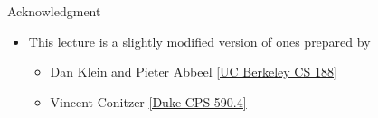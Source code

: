 \documentclass[11pt,aspectratio=169,handout]{beamer}
\begin{document}
  
  \begin{frame}{Acknowledgment}
   \begin{itemize}
   \setlength{\itemsep}{1em}
    \item This lecture is a slightly modified version of ones prepared by
    \begin{itemize}
     \item Dan Klein and Pieter Abbeel \href{http://ai.berkeley.edu/home.html}{[UC Berkeley CS 188]}
     \item Vincent Conitzer \href{https://courses.cs.duke.edu/spring16/compsci590.4/}{[Duke CPS 590.4]}
    \end{itemize}
   \end{itemize}
  \end{frame}
\end{document}
